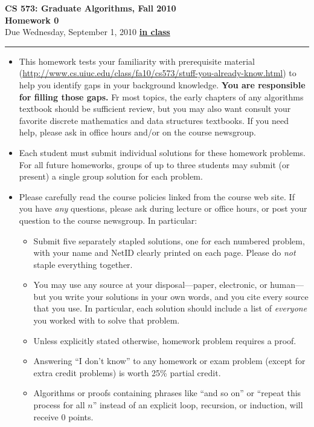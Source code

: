\documentclass[11pt]{article}
\begin{document}

\begin{center}
\LARGE
\textbf{CS 573: Graduate Algorithms, Fall 2010}
\\
\textbf{Homework 0}
\\[1ex]
\Large
Due Wednesday, September 1, 2010 \underline{\textbf{in class}}
\end{center}

\hrule

\begin{itemize}

\item
This homework tests your familiarity with prerequisite material (\url{http://www.cs.uiuc.edu/class/fa10/cs573/stuff-you-already-know.html}) to help you identify gaps in your background knowledge.  \textbf{You are responsible for filling those gaps.}  Fr most topics, the early chapters of any algorithms textbook should be sufficient review, but you may also want consult your favorite discrete mathematics and data structures textbooks.  If you need help, please ask in office hours and/or on the course newsgroup.

\item
Each student must submit individual solutions for these homework problems.  For all future homeworks, groups of up to three students may submit (or present) a single group solution for each problem.

\item
Please carefully read the course policies linked from the course web site.  If you have \emph{any} questions, please ask during lecture or office hours, or post your question to the course newsgroup.  In particular:
\begin{itemize}
\item
Submit five separately stapled solutions, one for each numbered problem, with your name and NetID clearly printed on each page.  Please do \emph{not} staple everything together.
\item
You may use any source at your disposal---paper, electronic, or human---but you  write your solutions in your own words, and you  cite every source that you use.  In particular, each solution should include a list of \emph{everyone} you worked with to solve that problem.
\item
Unless explicitly stated otherwise,  homework problem requires a proof.
\item
Answering ``I don't know'' to any homework or exam problem (except for extra credit problems) is worth 25\% partial credit.
\item
Algorithms or proofs containing phrases like ``and so on'' or ``repeat this process for all $n$'' instead of an explicit loop, recursion, or induction, will receive 0 points.
\end{itemize}

\end{itemize}
\end{document}
